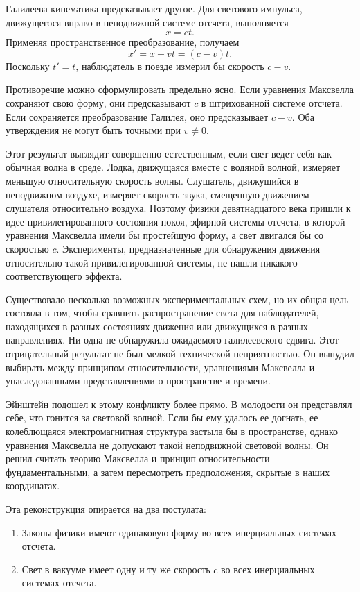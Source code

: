 Галилеева кинематика предсказывает другое. Для светового импульса, движущегося вправо в неподвижной системе отсчета, выполняется
\begin{equation}
x=ct.
\end{equation}
Применяя пространственное преобразование, получаем
\begin{equation}
x'=x-vt=(c-v)t.
\end{equation}
Поскольку \(t'=t\), наблюдатель в поезде измерил бы скорость \(c-v\).

Противоречие можно сформулировать предельно ясно. Если уравнения Максвелла сохраняют свою форму, они предсказывают \(c\) в штрихованной системе отсчета. Если сохраняется преобразование Галилея, оно предсказывает \(c-v\). Оба утверждения не могут быть точными при \(v\ne0\).

Этот результат выглядит совершенно естественным, если свет ведет себя как обычная волна в среде. Лодка, движущаяся вместе с водяной волной, измеряет меньшую относительную скорость волны. Слушатель, движущийся в неподвижном воздухе, измеряет скорость звука, смещенную движением слушателя относительно воздуха. Поэтому физики девятнадцатого века пришли к идее привилегированного состояния покоя, эфирной системы отсчета, в которой уравнения Максвелла имели бы простейшую форму, а свет двигался бы со скоростью \(c\). Эксперименты, предназначенные для обнаружения движения относительно такой привилегированной системы, не нашли никакого соответствующего эффекта.

Существовало несколько возможных экспериментальных схем, но их общая цель состояла в том, чтобы сравнить распространение света для наблюдателей, находящихся в разных состояниях движения или движущихся в разных направлениях. Ни одна не обнаружила ожидаемого галилеевского сдвига. Этот отрицательный результат не был мелкой технической неприятностью. Он вынудил выбирать между принципом относительности, уравнениями Максвелла и унаследованными представлениями о пространстве и времени.

Эйнштейн подошел к этому конфликту более прямо. В молодости он представлял себе, что гонится за световой волной. Если бы ему удалось ее догнать, ее колеблющаяся электромагнитная структура застыла бы в пространстве, однако уравнения Максвелла не допускают такой неподвижной световой волны. Он решил считать теорию Максвелла и принцип относительности фундаментальными, а затем пересмотреть предположения, скрытые в наших координатах.

Эта реконструкция опирается на два постулата:
\begin{enumerate}
\item Законы физики имеют одинаковую форму во всех инерциальных системах отсчета.
\item Свет в вакууме имеет одну и ту же скорость \(c\) во всех инерциальных системах отсчета.
\end{enumerate}

